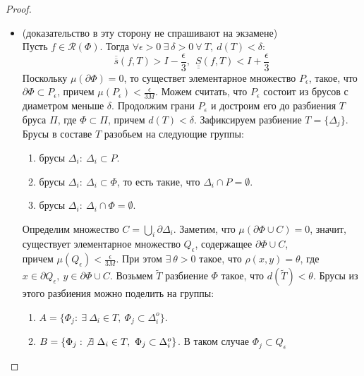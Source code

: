 \begin{proof}
\begin{itemize}
            \[|\sigma(\widehat{f}, T, H)-\widetilde{\sigma}(f, \widetilde{T},\widetilde{H})|\leq 2M \sum\limits_{\Delta_i\cap \partial\Phi\neq \emptyset}\mu(\Delta_i)\leq 2M\cdot \mu(Q_{\epsilon})=2M\cdot \frac{\epsilon}{2M}=\epsilon\]
            Значит
            \[|I-\sigma(\widehat{f}, T, H)|<\epsilon\]
        \item[$(\Rightarrow)$:] (доказательство в эту сторону не спрашивают на экзамене)\\
            Пусть $f\in \mathcal{R}(\Phi)$. Тогда $\forall \epsilon>0\ \exists\ \delta>0\ \forall\ T,\ d(T)<\delta$:
            \[\overline{\overline{s}}(f,T)>I-\frac{\epsilon}{3},\ \ \underline{\underline{S}}(f,T)<I+\frac{\epsilon}{3}\]
            Поскольку $\mu(\partial \Phi)=0$, то существет элементарное множество $P_{\epsilon}$, такое, что $\partial \Phi\subset P_{\epsilon}$, причем $\mu(P_{\epsilon})<\frac{\epsilon}{3M}$. Можем считать, что $P_{\epsilon}$ состоит из брусов с диаметром меньше $\delta$. Продолжим грани $P_{\epsilon}$ и достроим его до разбиения $T$ бруса $\Pi$, где $\Phi\subset \Pi$, причем $d(T)<\delta$. Зафиксируем разбиение $T=\{\Delta_j\}$. Брусы в составе $T$ разобьем на следующие группы:
            \begin{enumerate}
                \item брусы $\Delta_i:\ \Delta_i\subset P$.
                \item брусы $\Delta_i:\ \Delta_i\subset \Phi$, то есть такие, что $\Delta_i\cap P=\emptyset$.
                \item брусы $\Delta_i:\ \Delta_i\cap \Phi=\emptyset$.
            \end{enumerate}
            Определим множество $C=\bigcup\limits_i \partial \Delta_i$. Заметим, что $\mu(\partial \Phi\cup C)=0$, значит, существует элементарное множество $Q_{\epsilon}$, содержащее $\partial \Phi\cup C$,\\
            причем $\mu(Q_{\epsilon})<\frac{\epsilon}{3M}$. При этом $\exists\ \theta>0$ такое, что $\rho(x,y)=\theta$, где\\
            $x\in \partial Q_{\epsilon},\ y\in\partial \Phi\cup C$. Возьмем $\widetilde{T}$ разбиение $\Phi$ такое, что $d(\widetilde{T})<\theta$. Брусы из этого разбиения можно поделить на группы:
            \begin{enumerate}
                \item[(a)] $A=\{\Phi_j:\ \exists\ \Delta_i\in T,\ \Phi_j\subset \Delta_i^o\}$.
                \item[(b)] $B=\{\Phi_j:\ \not\exists\ \Delta_i\in T,\ \Phi_j\subset \Delta_i^o\}$. В таком случае $\Phi_j\subset Q_{\epsilon}$

\end{enumerate}
\end{itemize}
\end{proof}
